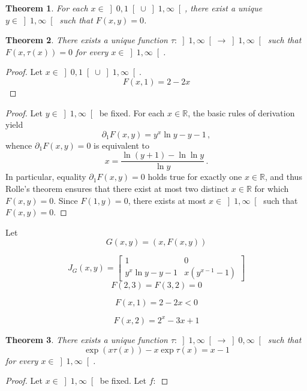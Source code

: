 \documentclass[12pt]{article}
\newcommand{\bR}{\mathbb{R}}
\newcommand{\gtint}[1]{\left] #1, \infty \right[}
\newtheorem{theorem}{Theorem}
\begin{document}
\begin{theorem}
  For each $x \in \left]0, 1 \right[ \cup \gtint{1}$,
  there exist a unique $y \in \gtint{1}$ such that $F(x, y) = 0$.
\end{theorem}

\begin{theorem}
  There exists a unique function $\tau\colon  \gtint{1} \to \gtint{1}$ such that
  $F(x, \tau(x)) = 0$ for every $x \in \gtint{1}$.
\end{theorem}

\begin{proof}
  Let $x \in \left] 0, 1 \right[ \cup \gtint{1}$.
  $$
   F(x, 1) = 2 - 2 x 
  $$

   
\end{proof}

\begin{proof}
  Let $y \in \gtint{1}$ be fixed.
  For each $x \in \bR$,
  the basic rules of derivation  yield 
$$
\partial_1 F(x, y) = y^x \ln y - y - 1 \,, 
$$
whence $\partial_1 F(x, y) = 0$ is equivalent to 
$$
x  = \frac{\ln (y + 1) - \ln \ln y}{\ln y} \, . 
$$
In particular, equality $\partial_1 F(x, y) = 0$ holds true for exactly one $x \in \bR$,
and thus Rolle's theorem ensures that there exist at most two distinct $x \in \bR$ for which $F(x, y) = 0$.
Since $F(1, y) = 0$, there exists at most $x \in \gtint{1}$ such that $F(x, y) = 0$.




\end{proof}



Let
$$
G(x, y) = (x, F(x, y))
$$

$$
J_G(x, y)
=
\begin{bmatrix}
    1  &  0 \\ 
    y^x \ln y - y - 1
    &  x (y^{x - 1} - 1) 
\end{bmatrix}
$$
$$
F(2, 3)  = F(3, 2) =  0
$$


$$
F(x, 1) = 2 - 2x < 0
$$ 

$$
F(x, 2) = 2^x - 3 x + 1
$$
\begin{theorem}
  There exists a unique function $\tau \colon \gtint{1} \to \gtint{0}$ such that
  $$
  \exp\left( x \tau(x) \right)  - x \exp  \tau(x) = x - 1
  $$
  for every $x \in \gtint{1}$.
\end{theorem}

\begin{proof}
  Let $x \in \gtint{1}$ be fixed.
  Let $f\colon $
\end{proof}
\end{document}
